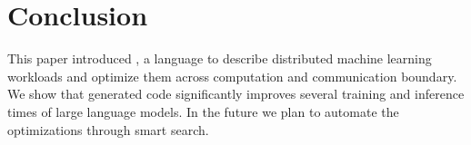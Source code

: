 \section{Conclusion}
\label{sec:conclusion}
This paper introduced \tool, a language to describe distributed machine learning workloads and optimize them across computation and communication boundary. 
We show that \tool{} generated code significantly improves several training and inference times of large language models. 
In the future we plan to automate the optimizations through smart search.

